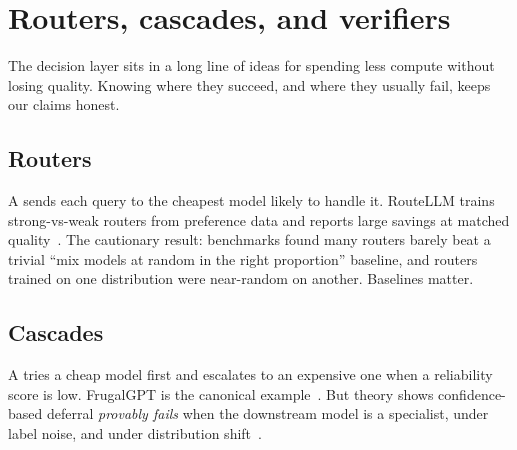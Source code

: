 \chapter{Routers, cascades, and verifiers}
\label{ch:routers}

The decision layer sits in a long line of ideas for spending less compute without losing
quality. Knowing where they succeed, and where they usually fail, keeps our claims honest.

\section{Routers}

A  sends each query to the cheapest model likely to handle it. RouteLLM trains
strong-vs-weak routers from preference data and reports large savings at matched
quality~\citep{routellm}. The cautionary result: benchmarks found many routers barely beat a
trivial ``mix models at random in the right proportion'' baseline, and routers trained on
one distribution were near-random on another. Baselines matter.

\section{Cascades}

A  tries a cheap model first and escalates to an expensive one when a
reliability score is low. FrugalGPT is the canonical example~\citep{frugalgpt}. But theory
shows confidence-based deferral \emph{provably fails} when the downstream model is a
specialist, under label noise, and under distribution shift~\citep{cascade_deferral}.

